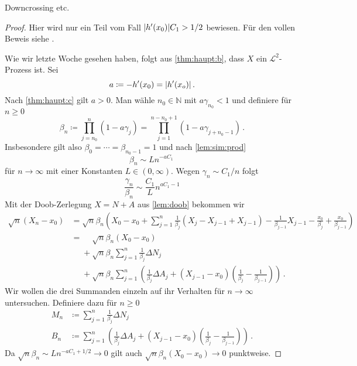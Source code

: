 \documentclass[ngerman,a4paper,11pt]{scrartcl}
\newcommand{\NN}{\mathbb{N}}
\renewcommand{\ll}{\mathcal{L}}
\DeclarePairedDelimiter{\abs}{\lvert}{\rvert}		%
\begin{document}
\begin{rem}
  Downcrossing etc.
\end{rem}
\begin{proof}
  Hier wird nur ein Teil vom Fall $\abs{h'(x_0)}C_1>1/2$ bewiesen. Für
  den vollen Beweis siehe \cite[Satz~11.4]{lpw}.
  
Wie wir letzte Woche gesehen haben, folgt aus \ref{thm:haupt:b}, dass $X$ ein
$\ll^2$-Prozess ist. Sei
\begin{equation*}
 a\coloneqq -h'(x_0)=\abs{h'(x_o)}\,. 
\end{equation*}
Nach \ref{thm:haupt:c} gilt $a>0$. Man wähle $n_0\in\NN$ mit $a\gamma_{n_0}<1$ und
definiere für $n\geq 0$
\begin{equation*}
 \beta_n\coloneqq\prod_{j=n_0}^n(1-a\gamma_j) =\prod_{j=1}^{n-n_0+1}(1-a\gamma_{j+n_0-1})\,.
\end{equation*}
Insbesondere gilt also $\beta_0=\dotsb=\beta_{n_0-1}=1$ und nach \cref{lem:sim:prod}
\begin{equation*}
 \beta_n\sim Ln^{-aC_1}\,
\end{equation*}
für $n\to\infty$ mit einer Konstanten $L\in(0,\infty)$. Wegen $\gamma_n\sim
C_1/n$ folgt
\begin{equation}
  \frac{\gamma_n}{\beta_n}\sim\frac{C_1}{L}n^{aC_1-1}\label{eq:gammabeta}
\end{equation}
Mit der Doob-Zerlegung $X=N+A$ aus \cref{lem:doob} bekommen wir
\begin{align*}
  \sqrt{n}(X_n-x_0)&=\sqrt{n}\beta_n\left(X_0-x_0+\sum_{j=1}^n\frac{1}{\beta_j}(X_j - X_{j-1} + X_{j-1})-\frac{1}{\beta_{j-1}}X_{j-1}-\frac{x_0}{\beta_j}+\frac{x_0}{\beta_{j-1}}\right)\nonumber \\
&=\phantom{+}\sqrt{n}\beta_n(X_0-x_0)\label{eq:1}\\
&\phantom{=}+\sqrt{n}\beta_n\sum_{j=1}^n\frac{1}{\beta_j}\Delta N_j\\
&\phantom{=}+\sqrt{n}\beta_n\sum_{j=1}^n\left(\frac{1}{\beta_j}\Delta A_j+(X_{j-1}-x_0)(\frac{1}{\beta_j}-\frac{1}{\beta_{j-1}})\right)\,. 
\end{align*}
Wir wollen die drei Summanden einzeln auf ihr Verhalten für $n\to\infty$
untersuchen. Definiere dazu für $n\geq 0$
\begin{align*}
 M_n&\coloneqq \sum_{j=1}^n\frac{1}{\beta_j}\Delta N_j\\
B_n&\coloneqq\sum_{j=1}^n\left(\frac{1}{\beta_j}\Delta A_j+(X_{j-1}-x_0)(\frac{1}{\beta_j}-\frac{1}{\beta_{j-1}})\right)\,.
\end{align*}
Da $\sqrt{n}\beta_n\sim Ln^{-aC_1+1/2}\to 0$ gilt auch
$\sqrt{n}\beta_n(X_0-x_0)\to 0$ punktweise.


\end{proof}
\end{document}
